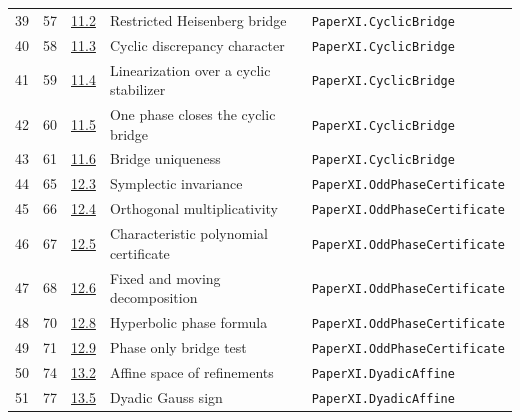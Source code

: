 \documentclass[10pt,oneside]{book}
\begin{document}
\begin{longtable}{@{}p{}p{}p{}>{\raggedright\arraybackslash}p{}p{}@{}}
39&57&\href{https://komorebi.invalid/b07/obligation_39}{11.2}&Restricted Heisenberg bridge&\nolinkurl{PaperXI.CyclicBridge}\\

40&58&\href{https://komorebi.invalid/b07/obligation_40}{11.3}&Cyclic discrepancy character&\nolinkurl{PaperXI.CyclicBridge}\\

41&59&\href{https://komorebi.invalid/b07/obligation_41}{11.4}&Linearization over a cyclic stabilizer&\nolinkurl{PaperXI.CyclicBridge}\\

42&60&\href{https://komorebi.invalid/b07/obligation_42}{11.5}&One phase closes the cyclic bridge&\nolinkurl{PaperXI.CyclicBridge}\\

43&61&\href{https://komorebi.invalid/b07/obligation_43}{11.6}&Bridge uniqueness&\nolinkurl{PaperXI.CyclicBridge}\\

44&65&\href{https://komorebi.invalid/b07/obligation_44}{12.3}&Symplectic invariance&\nolinkurl{PaperXI.OddPhaseCertificate}\\

45&66&\href{https://komorebi.invalid/b07/obligation_45}{12.4}&Orthogonal multiplicativity&\nolinkurl{PaperXI.OddPhaseCertificate}\\

46&67&\href{https://komorebi.invalid/b07/obligation_46}{12.5}&Characteristic polynomial certificate&\nolinkurl{PaperXI.OddPhaseCertificate}\\

47&68&\href{https://komorebi.invalid/b07/obligation_47}{12.6}&Fixed and moving decomposition&\nolinkurl{PaperXI.OddPhaseCertificate}\\

48&70&\href{https://komorebi.invalid/b07/obligation_48}{12.8}&Hyperbolic phase formula&\nolinkurl{PaperXI.OddPhaseCertificate}\\

49&71&\href{https://komorebi.invalid/b07/obligation_49}{12.9}&Phase only bridge test&\nolinkurl{PaperXI.OddPhaseCertificate}\\

50&74&\href{https://komorebi.invalid/b07/obligation_50}{13.2}&Affine space of refinements&\nolinkurl{PaperXI.DyadicAffine}\\

51&77&\href{https://komorebi.invalid/b07/obligation_51}{13.5}&Dyadic Gauss sign&\nolinkurl{PaperXI.DyadicAffine}\\


\end{longtable}
\end{document}
